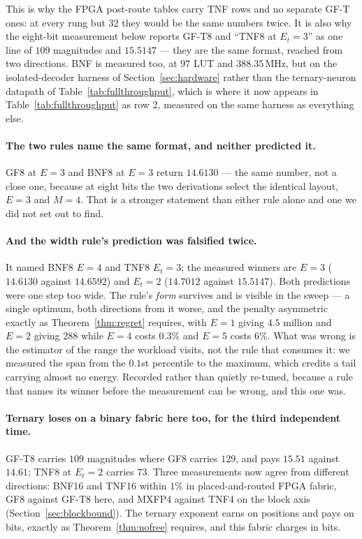 \documentclass[11pt]{article}
\theoremstyle{definition}
\begin{document}
This is why the FPGA post-route tables carry TNF rows and no separate GF-T ones: at
every rung but 32 they would be the same numbers twice. It is also why the
eight-bit measurement below reports GF-T8 and ``TNF8 at $E_t=3$'' as one line
of $109$ magnitudes and $15.5147$ --- they are the same format, reached from two
directions. BNF is measured too, at $97$ LUT and $388.35$\,MHz, but on the
isolated-decoder harness of Section~\ref{sec:hardware} rather than the
ternary-neuron datapath of Table~\ref{tab:fullthroughput}, which is where
it now appears in Table~\ref{tab:fullthroughput} as row 2, measured on the
same harness as everything else.

\paragraph{The two rules name the same format, and neither predicted it.}
GF8 at $E=3$ and BNF8 at $E=3$ return $14.6130$ --- the same number, not a close
one, because at eight bits the two derivations select the identical layout,
$E=3$ and $M=4$. That is a stronger statement than either rule alone and one we
did not set out to find.

\paragraph{And the width rule's prediction was falsified twice.} It named BNF8
$E=4$ and TNF8 $E_t=3$; the measured winners are $E=3$ ($14.6130$ against
$14.6592$) and $E_t=2$ ($14.7012$ against $15.5147$). Both predictions were one
step too wide. The rule's \emph{form} survives and is visible in the sweep ---
a single optimum, both directions from it worse, and the penalty asymmetric
exactly as Theorem~\ref{thm:regret} requires, with $E=1$ giving $4.5$ million
and $E=2$ giving $288$ while $E=4$ costs $0.3\%$ and $E=5$ costs $6\%$. What was
wrong is the estimator of the range the workload visits, not the rule that
consumes it: we measured the span from the $0.1$st percentile to the maximum,
which credits a tail carrying almost no energy. Recorded rather than quietly
re-tuned, because a rule that names its winner before the measurement can be
wrong, and this one was.

\paragraph{Ternary loses on a binary fabric here too, for the third independent
time.} GF-T8 carries $109$ magnitudes where GF8 carries $129$, and pays $15.51$
against $14.61$; TNF8 at $E_t=2$ carries $73$. Three measurements now agree from
different directions: BNF16 and TNF16 within $1\%$ in placed-and-routed FPGA
fabric, GF8
against GF-T8 here, and MXFP4 against TNF4 on the block axis
(Section~\ref{sec:blockbound}). The ternary exponent earns on positions and pays
on bits, exactly as Theorem~\ref{thm:nofree} requires, and this fabric charges
in bits.
\end{document}

